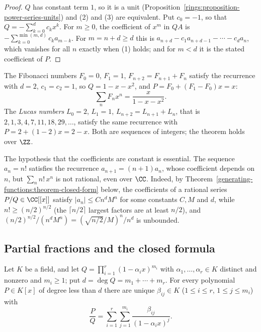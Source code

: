 \begin{proof}
$Q$ has constant term $1$, so it is a unit (Proposition~\ref{rings:proposition-power-series-units}) and (2) and (3) are equivalent. Put $c_0 = -1$, so that $Q = -\sum_{k=0}^{d}c_kx^k$. For
$m \geq 0$, the coefficient of $x^m$ in $QA$ is $-\sum_{k=0}^{\min(m, d)}c_ka_{m-k}$. For $m = n + d \geq d$ this is $a_{n+d} - c_1a_{n+d-1} - \cdots - c_da_n$, which vanishes for all $n$ exactly when
(1) holds; and for $m < d$ it is the stated coefficient of $P$.
\end{proof}

\begin{example}\label{generating-functions:example-fibonacci-gf}
The Fibonacci numbers $F_0 = 0$, $F_1 = 1$, $F_{n+2} = F_{n+1} + F_n$ satisfy the recurrence with $d = 2$, $c_1 = c_2 = 1$, so $Q = 1 - x - x^2$, and $P = F_0 + (F_1 - F_0)x = x$:
\[
\sum_nF_nx^n = \frac{x}{1 - x - x^2}.
\]
The \emph{Lucas numbers} $L_0 = 2$, $L_1 = 1$, $L_{n+2} = L_{n+1} + L_n$, that is $2, 1, 3, 4, 7, 11, 18, 29, \ldots$, satisfy the same recurrence with $P = 2 + (1 - 2)x = 2 - x$. Both are sequences of
integers; the theorem holds over $\ZZ$.
\end{example}

\begin{counterexample}\label{generating-functions:counterexample-variable-coefficients}
The hypothesis that the coefficients are constant is essential. The sequence $a_n = n!$ satisfies the recurrence $a_{n+1} = (n + 1)a_n$, whose coefficient depends on $n$, but $\sum_nn!\,x^n$ is not
rational, even over $\CC$. Indeed, by Theorem~\ref{generating-functions:theorem-closed-form} below, the coefficients of a rational series $P/Q \in \CC[[x]]$ satisfy $|a_n| \leq Cn^dM^n$ for some
constants $C, M$ and $d$, while $n! \geq (n/2)^{n/2}$ (the $\lceil n/2\rceil$ largest factors are at least $n/2$), and $(n/2)^{n/2}/(n^dM^n) = (\sqrt{n/2}/M)^n/n^d$ is unbounded.
\end{counterexample}

\subsection{Partial fractions and the closed formula}\label{generating-functions:subsection-partial-fractions}

\begin{lemma}\label{generating-functions:lemma-partial-fractions}
Let $K$ be a field, and let $Q = \prod_{i=1}^{r}(1 - \alpha_ix)^{m_i}$ with $\alpha_1, \ldots, \alpha_r \in K$ distinct and nonzero and $m_i \geq 1$; put $d = \deg Q = m_1 + \cdots + m_r$. For every
polynomial $P \in K[x]$ of degree less than $d$ there are unique $\beta_{ij} \in K$ ($1 \leq i \leq r$, $1 \leq j \leq m_i$) with
\[
\frac{P}{Q} = \sum_{i=1}^{r}\sum_{j=1}^{m_i}\frac{\beta_{ij}}{(1 - \alpha_ix)^j}.
\]
\end{lemma}


